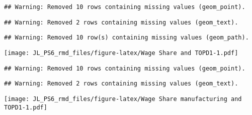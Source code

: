 \documentclass[
]{article}
\newenvironment{Shaded}{\begin{snugshade}}{\end{snugshade}}
\newcommand{\DataTypeTok}[1]{\textcolor[rgb]{0.13,0.29,0.53}{#1}}
\newcommand{\DecValTok}[1]{\textcolor[rgb]{0.00,0.00,0.81}{#1}}
\newcommand{\FloatTok}[1]{\textcolor[rgb]{0.00,0.00,0.81}{#1}}
\newcommand{\KeywordTok}[1]{\textcolor[rgb]{0.13,0.29,0.53}{\textbf{#1}}}
\newcommand{\NormalTok}[1]{#1}
\newcommand{\OperatorTok}[1]{\textcolor[rgb]{0.81,0.36,0.00}{\textbf{#1}}}
\newcommand{\StringTok}[1]{\textcolor[rgb]{0.31,0.60,0.02}{#1}}
\begin{document}
\begin{verbatim}
## Warning: Removed 10 rows containing missing values (geom_point).
\end{verbatim}

\begin{verbatim}
## Warning: Removed 2 rows containing missing values (geom_text).
\end{verbatim}

\begin{verbatim}
## Warning: Removed 10 row(s) containing missing values (geom_path).
\end{verbatim}

\texttt{[image: JL\_PS6\_rmd\_files/figure-latex/Wage Share and TOPD1-1.pdf]}

\begin{Shaded}
\end{Shaded}

\begin{verbatim}
## Warning: Removed 10 rows containing missing values (geom_point).
\end{verbatim}

\begin{verbatim}
## Warning: Removed 2 rows containing missing values (geom_text).
\end{verbatim}

\texttt{[image: JL\_PS6\_rmd\_files/figure-latex/Wage Share manufacturing and TOPD1-1.pdf]}
\end{document}
